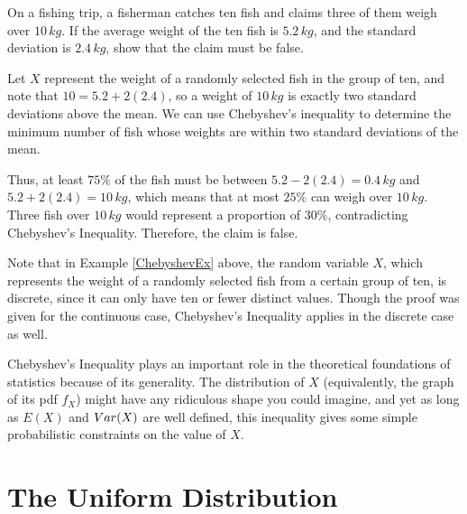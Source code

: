 \begin{examp}\label{ChebyshevEx}On a fishing trip, a fisherman catches ten fish and claims three of them weigh over $10\,kg$. If the average weight of the ten fish is $5.2\,kg$, and the standard deviation is $2.4\,kg$, show that the claim must be false.
\par
\noindent Let $X$ represent the weight of a randomly selected fish in the group of ten, and note that $10 = 5.2+2(2.4)$, so a weight of $10\,kg$ is exactly two standard deviations above the mean. We can use Chebyshev's inequality to determine the minimum number of fish whose weights are within two standard deviations of the mean.
\par
\noindent Thus, at least $75\%$ of the fish must be between $5.2 - 2(2.4) = 0.4\,kg$ and $5.2 + 2(2.4) = 10\,kg$, which means that at most $25\%$ can weigh over $10\,kg$. Three fish over $10\,kg$ would represent a proportion of $30\%$, contradicting Chebyshev's Inequality. Therefore, the claim is false.
\end{examp}
\par
\rmk Note that in Example \ref{ChebyshevEx} above, the random variable $X$, which represents the weight of a randomly selected fish from a certain group of ten, is discrete, since it can only have ten or fewer distinct values. Though the proof was given for the continuous case, Chebyshev's Inequality applies in the discrete case as well.
\par
Chebyshev's Inequality plays an important role in the theoretical foundations of statistics because of its generality. The distribution of $X$ (equivalently, the graph of its pdf $f_X$) might have any ridiculous shape you could imagine, and yet as long as $E(X)$ and $Var(X)$ are well defined, this inequality gives some simple probabilistic constraints on the value of $X$.

\section{The Uniform Distribution}\label{UniformDistSec}


